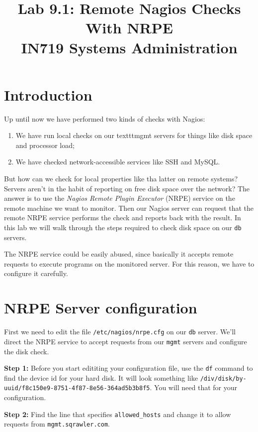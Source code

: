 \documentclass{article}   	%
\title{Lab 9.1:  Remote Nagios Checks With NRPE\\ IN719 Systems Administration}
\date{}							%
\begin{document}
\maketitle

\section*{Introduction}
Up until now we have performed two kinds of checks with Nagios:

\begin{enumerate}
  \item We have run local checks on our texttt{mgmt} servers for things like disk space and processor load;
  \item We have checked network-accessible services like SSH and MySQL.
\end{enumerate}

But how can we check for local properties like tha latter on remote systems?  Servers aren't in the habit of reporting on free disk space over the network?  The answer is to use the \emph{Nagios Remote Plugin Executor} (NRPE) service on the remote machine we want to monitor.  Then our Nagios server can request that the remote NRPE service performs the check and reports back with the result.  In this lab we will walk through the steps required to check disk space on our \texttt{db} servers.

The NRPE service could be easily abused, since basically it accepts remote requests to execute programs on the monitored server.  For this reason, we have to configure it carefully.

\section{NRPE Server configuration}
First we need to edit the file \texttt{/etc/nagios/nrpe.cfg} on our \texttt{db} server.  We'll direct the NRPE service to accept requests from our \texttt{mgmt} servers and configure the disk check.

\textbf{Step 1:} Before you start edititing your configuration file, use the \texttt{df} command to find the device id for your hard disk.  It will look something like \texttt{/div/disk/by-uuid/f8c150e9-8751-4f87-8e56-364ad5b3b8f5}.  You will need that for your configuration.

\textbf{Step 2:} Find the line that specifies \texttt{allowed\_hosts} and change it to allow requests from \texttt{mgmt.sqrawler.com}.
\end{document}
